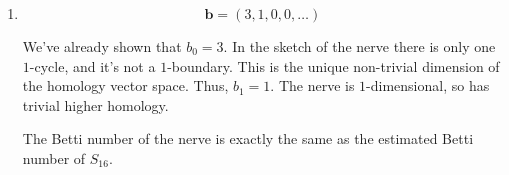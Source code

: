 \documentclass[12 pt, letterpaper]{hmcpset}
\begin{document}
\begin{solution}
\begin{enumerate}
			Since the condition that two maximal simplicial complexes intersect is equivalent to the condition that their least common multiple is at most $16$, we can write the nerve as
			\[
				\operatorname{nerve} \mathcal{U} = \{ \{ U_{p_{1}}, \dots, U_{p_{n}} \} \mid p_{1} \cdots p_{n} \le 16 \}.
			\]
			(The least common multiple of distinct primes is just their product). There are no triples of primes such that this is true (the three smallest primes have product $2 \times 3 \times 5 = 30 > 16$). The pairs of primes for which this is true are $2 \times 3 = 6$, $2 \times 5 = 10$, $2 \times 7 = 14$ and $3 \times 5 = 15$. Thus,
			\[
				\operatorname{nerve} \mathcal{U} = \{ \{ U_{2} \}, \{ U_{3} \}, \{ U_{5} \}, \{ U_{7} \}, \{ U_{11} \}, \{ U_{13} \}, \{ U_{2}, U_{3} \}, \{ U_{2}, U_{5} \}, \{ U_{2}, U_{7} \}  \{ U_{3}, U_{5} \} \}.
			\]

		\item
			\[
				\boxed{
					\mathbf{b} = (3, 1, 0, 0, \dots)
				}
			\]

			We've already shown that $b_{0} = 3$. In the sketch of the nerve there is only one $1$-cycle, and it's not a $1$-boundary. This is the unique non-trivial dimension of the homology vector space. Thus, $b_{1} = 1$.
			The nerve is $1$-dimensional, so has trivial higher homology.

			The Betti number of the nerve is exactly the same as the estimated Betti number of $S_{16}$.
	\end{enumerate}
\end{solution}
\end{document}
